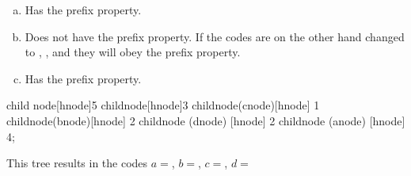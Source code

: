\begin{Answer}[ref={prefix-prop}]

  \begin{enumerate}[(a)]
  \item Has the prefix property.
  \item Does not have the prefix property. If the codes are on the
    other hand changed to , ,  and 
    they will obey the prefix property.
  \item Has the prefix property.

  \end{enumerate}

\end{Answer}

\begin{Answer}[ref={nuther}]
  \begin{huffmanc}

    child {node[hnode]{5}
      child{node[hnode]{3}
        child{node(cnode)[hnode] {1}}
        child{node(bnode)[hnode] {2}}}
      child{node (dnode) [hnode] {2}}}
    child{node (anode) [hnode] {4}};


  \end{huffmanc}

  This tree results in the codes $a=$, $b=$,
  $c=$, $d=$

\end{Answer}